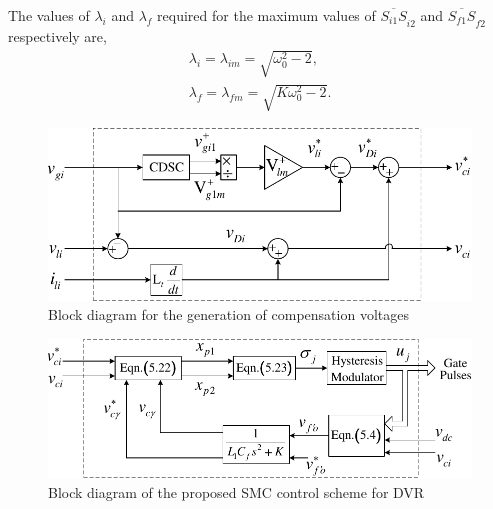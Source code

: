 The values of $\lambda_{i}$ and $\lambda_{f}$ required for the maximum values of $\overline{S_{i1}S}_{i2}$ and $\overline{S_{f1}S}_{f2}$ respectively are,
\begin{equation} \label{5.107} %
\begin{aligned}
\lambda_{i} = \lambda_{im} = \sqrt{\omega^{2}_{0} - 2}, \\[0.1cm]
\lambda_{f} = \lambda_{fm} = \sqrt{K\omega^{2}_{0} - 2}.
\end{aligned}
\end{equation}
\begin{figure}[b!]
	\centering
	\includegraphics[scale=0.9]{figures/Chapter_5/Mine/Reference_Generation}
	\caption{Block diagram for the generation of compensation voltages} %
	\label{fig5.6}
\end{figure} 
\begin{figure}[b!]
	\centering
	\includegraphics[scale=0.9]{figures/Chapter_5/Mine/Control_Diagram1}
	\caption{Block diagram of the proposed SMC control scheme for DVR} %
	\label{fig5.61}
\end{figure} 

